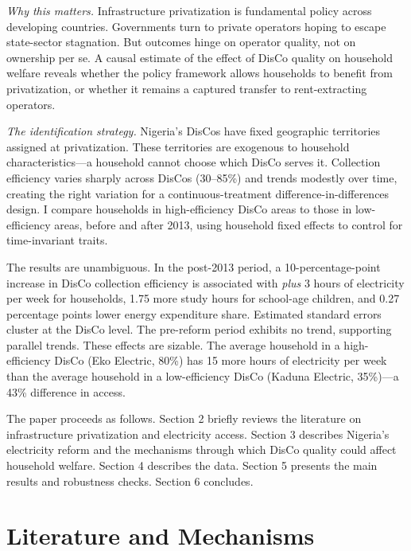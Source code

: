 \documentclass[12pt]{article}
\begin{document}
\textit{Why this matters.} Infrastructure privatization is fundamental policy across developing countries. Governments turn to private operators hoping to escape state-sector stagnation. But outcomes hinge on operator quality, not on ownership per se. A causal estimate of the effect of DisCo quality on household welfare reveals whether the policy framework allows households to benefit from privatization, or whether it remains a captured transfer to rent-extracting operators.

\textit{The identification strategy.} Nigeria's DisCos have fixed geographic territories assigned at privatization. These territories are exogenous to household characteristics---a household cannot choose which DisCo serves it. Collection efficiency varies sharply across DisCos (30--85\%) and trends modestly over time, creating the right variation for a continuous-treatment difference-in-differences design. I compare households in high-efficiency DisCo areas to those in low-efficiency areas, before and after 2013, using household fixed effects to control for time-invariant traits.

The results are unambiguous. In the post-2013 period, a 10-percentage-point increase in DisCo collection efficiency is associated with \textit{plus} 3 hours of electricity per week for households, 1.75 more study hours for school-age children, and 0.27 percentage points lower energy expenditure share. Estimated standard errors cluster at the DisCo level. The pre-reform period exhibits no trend, supporting parallel trends. These effects are sizable. The average household in a high-efficiency DisCo (Eko Electric, 80\%) has 15 more hours of electricity per week than the average household in a low-efficiency DisCo (Kaduna Electric, 35\%)---a 43\% difference in access.

The paper proceeds as follows. Section 2 briefly reviews the literature on infrastructure privatization and electricity access. Section 3 describes Nigeria's electricity reform and the mechanisms through which DisCo quality could affect household welfare. Section 4 describes the data. Section 5 presents the main results and robustness checks. Section 6 concludes.

\section{Literature and Mechanisms}
\end{document}
